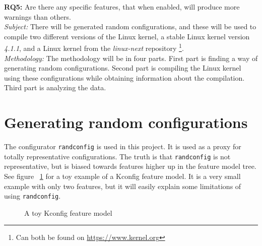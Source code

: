 \documentclass[a4paper,11pt]{report}
\newcommand{\figa}{
    \begin{figure}[!htpb]
    \centering
}
\newcommand{\figb}[2]{
    \caption{#1}
    \label{#2}
    \end{figure}
}
\begin{document}
\textbf{RQ5:} Are there any specific features, that when enabled, will produce 
more warnings than others. 
\\


\emph{Subject:}
There will be generated random configurations, and these will be used to 
compile two different versions of the Linux kernel, a stable Linux kernel 
version \emph{4.1.1}, and a Linux kernel from the \emph{linux-next} repository
    \footnote{Can both be found on \url{https://www.kernel.org}}.
\\

\emph{Methodology:}
The methodology will be in four parts. First part is finding a way of
generating random configurations. Second part is compiling the Linux kernel 
using these configurations while obtaining information about the compilation.
Third part is analyzing the data.



\section{Generating random configurations}

The configurator \texttt{randconfig} is used in this project. It is used as a 
proxy for totally representative configurations. The truth is that 
\texttt{randconfig} is not representative, but is biased towards features 
higher up in the feature model tree.
\\

See figure ~\ref{randconfigtoy} for a toy example of a Kconfig feature model. 
It is a very small example with only two features, but it will easily explain 
some limitations of using \texttt{randconfig}.

\figa
    
\figb{A toy Kconfig feature model}{randconfigtoy}
\end{document}
